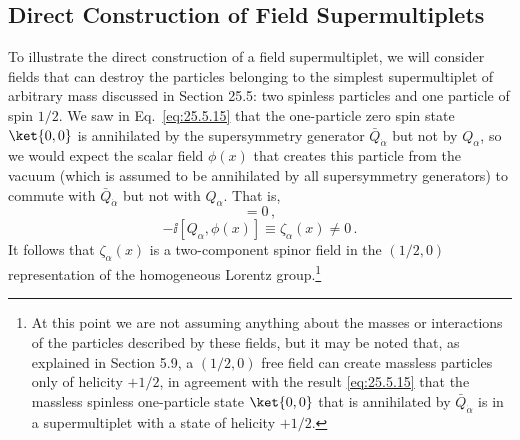 
\subsection{Direct Construction of Field Supermultiplets}

To illustrate the direct construction of a field supermultiplet, we will
consider fields that can destroy the particles belonging to the simplest
supermultiplet of arbitrary mass discussed in Section 25.5: two spinless
particles and one particle of spin \(1/2\). We saw in
Eq.~\eqref{eq:25.5.15} that the one-particle zero spin state \(\ket{0,0}\) is
annihilated by the supersymmetry generator \(\bar Q_{\dot\alpha}\) but not
by \(Q_\alpha\), so we would expect the scalar field \(\phi(x)\) that creates
this particle from the vacuum (which is assumed to be annihilated by all
supersymmetry generators) to commute with \(\bar Q_{\dot\alpha}\) but not
with \(Q_\alpha\). That is,
\begin{equation}
  [\bar Q_{\dot\alpha},\phi(x)]=0\,,
  \tag{26.1.1}\label{eq:26.1.1}
\end{equation}
\begin{equation}
  -\ii[Q_\alpha,\phi(x)]
  \equiv\zeta_\alpha(x)\ne0\,.
  \tag{26.1.2}\label{eq:26.1.2}
\end{equation}
It follows that \(\zeta_\alpha(x)\) is a two-component spinor field in the
\((1/2,0)\) representation of the homogeneous Lorentz group.\footnote{At
this point we are not assuming anything about the masses or interactions of
the particles described by these fields, but it may be noted that, as
explained in Section 5.9, a \((1/2,0)\) free field can create massless
particles only of helicity \(+1/2\), in agreement with the result
\eqref{eq:25.5.15} that the massless spinless one-particle state
\(\ket{0,0}\) that is annihilated by \(\bar Q_{\dot\alpha}\) is in a
supermultiplet
with a state of helicity \(+1/2\).}

